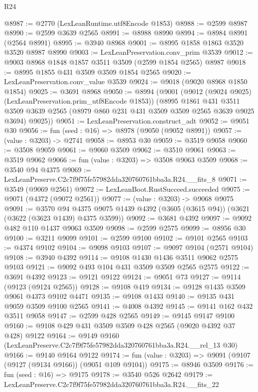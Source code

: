 \begin{lexlean}{R24}
\begin{coremodule}
@8987 := @2770 (LexLeanRuntime.utf8Encode @1853)
@8988 := @2599 @8987
@8990 := @2599 @3639 @2565
@8991 := @8988 @8990
@8994 := @8984 @8991 (@2564 @8991)
@8995 := @3940 @8968
@9001 := @8995 @1858 @1863 @3520 @3520 @8987 @8990
@9003 := LexLeanPreservation.conv_prim @3539
@9012 := @9003 @8968 @1848 @1857 @3511 @3509 (@2599 @1854 @2565) @8987
@9018 := @8995 @1855 @431 @3509 @3509 @1854 @2565
@9020 := LexLeanPreservation.conv_value @3539
@9024 := @9018 (@9020 @8968 @1850 @1854)
@9025 := @3691 @8968
@9050 := @8994
    (@9001
      (@9012 (@9024 @9025) (LexLeanPreservation.prim_utf8Encode @1853))
      (@8995
        @1861
        @431
        @3511
        @3509
        @3639
        @2565
        (@8979 @860 @231 @431 @3509 @3509 @2565 @3639 @9025 @3694)
        @9025))
@9051 := LexLeanPreservation.construct_adt
@9052 := @9051 @30
@9056 := fun (seed : @16) => @8978 (@9050 (@9052 @8991))
@9057 := (value : @3203) -> @2741
@9058 := @8953 @30
@9059 := @3519 @9058
@9060 := @3508 @9059
@9061 := @9060 @3509
@9062 := @3510 @9061
@9063 := @3519 @9062
@9066 := fun (value : @3203) => @3508 @9063 @3509
@9068 := @3540 @94 @4375
@9069 := LexLeanPreserve.C2c7f9f75fe57982dda320760761bba3a.R24.__fits_8
@9071 := @3549 (@9069 @2561)
@9072 := LexLeanBoot.RustSucceed.succeeded
@9075 := @9071 (@4372 (@9072 @2561))
@9077 := (value : @3203) -> @9068 @9075
@9091 := @3570
    @94
    @4375
    @9075
    @1439
    @4392
    (@3605 (@3615 @94))
    (@3621 (@3622 (@3623 @1439) @4375 @3599))
@9092 := @3681 @4392
@9097 := @9092 @482 @110 @1437 @9063 @3509
@9098 := @2599 @2575
@9099 := @8956 @30
@9100 := @3211 @9099
@9101 := @2599 @9100
@9102 := @9101 @2565
@9103 := @4374 @9102
@9104 := @9098 @9103
@9107 := @9097 @9104 (@2571 @9104)
@9108 := @3940 @4392
@9114 := @9108 @1430 @1436 @3511 @9062 @2575 @9103
@9121 := @9092 @493 @104 @431 @3509 @3509 @2565 @2575
@9122 := @3691 @4392
@9123 := @9121 @9122
@9124 := @9051 @73
@9127 := @9114 (@9123 (@9124 @2565))
@9128 := @9108 @419
@9134 := @9128 @1435 @3509 @9061 @4373 @9102 @4471
@9135 := @9108 @1433
@9140 := @9135 @431 @9059 @3509 @9100 @2565
@9141 := @4008 @4392
@9145 := @9141 @162 @432 @3511 @9058
@9147 := @2599 @428 @2565
@9149 := @9145 @9147 @9100
@9160 := @9108 @429 @431 @3509 @3509 @428 @2565 (@9020 @4392 @37 @428) @9122
@9164 := @9149 @9160 (LexLeanPreserve.C2c7f9f75fe57982dda320760761bba3a.R24.__rel_13 @30)
@9166 := @9140 @9164 @9122
@9174 := fun (value : @3203) => @9091 (@9107 (@9127 (@9134 @9166)) (@9051 @109 @9104))
@9175 := @8946 @3509
@9176 := fun (seed : @16) => @9175
@9178 := @3540 @526 @2642
@9179 := LexLeanPreserve.C2c7f9f75fe57982dda320760761bba3a.R24.__fits_22

\end{coremodule}
\end{lexlean}
